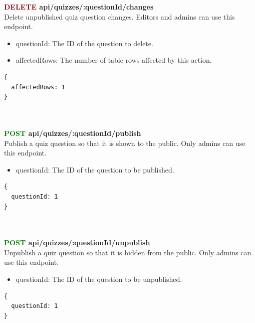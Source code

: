 \documentclass[onecolumn, draftclsnofoot,10pt, compsoc, usenames, dvipsnames]{IEEEtran}
\begin{document}
\noindent
\textbf{\textcolor{Maroon}{DELETE} api/quizzes/:questionId/changes} \\
Delete unpublished quiz question changes. Editors and admins can use this endpoint.
\begin{itemize}
  \item questionId: The ID of the question to delete.
  \item affectedRows: The number of table rows affected by this action.
\end{itemize}
\begin{lstlisting}[caption=Example Response]
{ 
  affectedRows: 1
}
\end{lstlisting}
\\~\\


\noindent
\textbf{\textcolor{Green}{POST} api/quizzes/:questionId/publish} \\
Publish a quiz question so that it is shown to the public. Only admins can use this endpoint.
\begin{itemize}
    \item questionId: The ID of the question to be published.
\end{itemize}
\begin{lstlisting}[caption=Example Response]
{
  questionId: 1
}
\end{lstlisting}
\\~\\


\noindent
\textbf{\textcolor{Green}{POST} api/quizzes/:questionId/unpublish} \\
Unpublish a quiz question so that it is hidden from the public. Only admins can use this endpoint.
\begin{itemize}
    \item questionId: The ID of the question to be unpublished.
\end{itemize}
\begin{lstlisting}[caption=Example Response]
{
  questionId: 1
}
\end{lstlisting}
\\~\\
\end{document}
